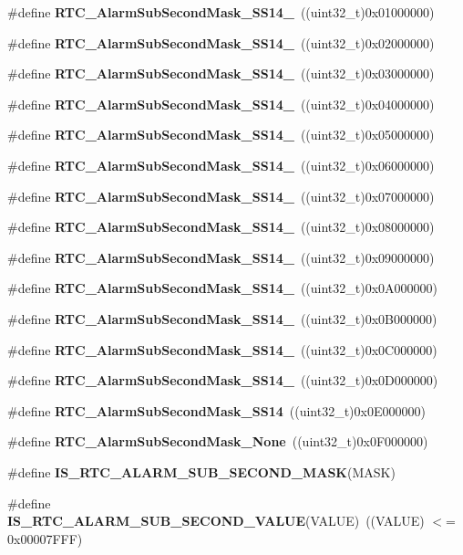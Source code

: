 \begin{DoxyCompactItemize}
\#define \textbf{ R\+T\+C\+\_\+\+Alarm\+Sub\+Second\+Mask\+\_\+\+S\+S14\+\_}~((uint32\+\_\+t)0x01000000)
\item 
\#define \textbf{ R\+T\+C\+\_\+\+Alarm\+Sub\+Second\+Mask\+\_\+\+S\+S14\+\_}~((uint32\+\_\+t)0x02000000)
\item 
\#define \textbf{ R\+T\+C\+\_\+\+Alarm\+Sub\+Second\+Mask\+\_\+\+S\+S14\+\_}~((uint32\+\_\+t)0x03000000)
\item 
\#define \textbf{ R\+T\+C\+\_\+\+Alarm\+Sub\+Second\+Mask\+\_\+\+S\+S14\+\_}~((uint32\+\_\+t)0x04000000)
\item 
\#define \textbf{ R\+T\+C\+\_\+\+Alarm\+Sub\+Second\+Mask\+\_\+\+S\+S14\+\_}~((uint32\+\_\+t)0x05000000)
\item 
\#define \textbf{ R\+T\+C\+\_\+\+Alarm\+Sub\+Second\+Mask\+\_\+\+S\+S14\+\_}~((uint32\+\_\+t)0x06000000)
\item 
\#define \textbf{ R\+T\+C\+\_\+\+Alarm\+Sub\+Second\+Mask\+\_\+\+S\+S14\+\_}~((uint32\+\_\+t)0x07000000)
\item 
\#define \textbf{ R\+T\+C\+\_\+\+Alarm\+Sub\+Second\+Mask\+\_\+\+S\+S14\+\_}~((uint32\+\_\+t)0x08000000)
\item 
\#define \textbf{ R\+T\+C\+\_\+\+Alarm\+Sub\+Second\+Mask\+\_\+\+S\+S14\+\_}~((uint32\+\_\+t)0x09000000)
\item 
\#define \textbf{ R\+T\+C\+\_\+\+Alarm\+Sub\+Second\+Mask\+\_\+\+S\+S14\+\_}~((uint32\+\_\+t)0x0\+A000000)
\item 
\#define \textbf{ R\+T\+C\+\_\+\+Alarm\+Sub\+Second\+Mask\+\_\+\+S\+S14\+\_}~((uint32\+\_\+t)0x0\+B000000)
\item 
\#define \textbf{ R\+T\+C\+\_\+\+Alarm\+Sub\+Second\+Mask\+\_\+\+S\+S14\+\_}~((uint32\+\_\+t)0x0\+C000000)
\item 
\#define \textbf{ R\+T\+C\+\_\+\+Alarm\+Sub\+Second\+Mask\+\_\+\+S\+S14\+\_}~((uint32\+\_\+t)0x0\+D000000)
\item 
\#define \textbf{ R\+T\+C\+\_\+\+Alarm\+Sub\+Second\+Mask\+\_\+\+S\+S14}~((uint32\+\_\+t)0x0\+E000000)
\item 
\#define \textbf{ R\+T\+C\+\_\+\+Alarm\+Sub\+Second\+Mask\+\_\+\+None}~((uint32\+\_\+t)0x0\+F000000)
\item 
\#define \textbf{ I\+S\+\_\+\+R\+T\+C\+\_\+\+A\+L\+A\+R\+M\+\_\+\+S\+U\+B\+\_\+\+S\+E\+C\+O\+N\+D\+\_\+\+M\+A\+SK}(M\+A\+SK)
\item 
\#define \textbf{ I\+S\+\_\+\+R\+T\+C\+\_\+\+A\+L\+A\+R\+M\+\_\+\+S\+U\+B\+\_\+\+S\+E\+C\+O\+N\+D\+\_\+\+V\+A\+L\+UE}(V\+A\+L\+UE)~((V\+A\+L\+UE) $<$= 0x00007\+F\+F\+F)

\end{DoxyCompactItemize}
